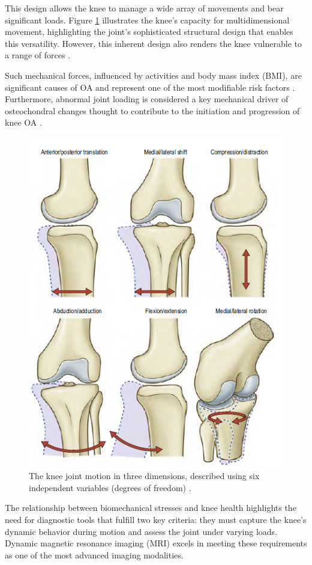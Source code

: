 \documentclass{micro-econ-thesis}
\begin{document}
This design allows the knee to manage a wide array of movements and bear significant loads. Figure \ref{fig:sixdegrees} illustrates the knee's capacity for multidimensional movement, highlighting the joint's sophisticated structural design that enables this versatility. However, this inherent design also renders the knee vulnerable to a range of forces \parencite{standring_grays_2021}.

Such mechanical forces, influenced by activities and body mass index (BMI), are significant causes of OA and represent one of the most modifiable risk factors \parencite{heidari_knee_2011}. Furthermore, abnormal joint loading is considered a key mechanical driver of osteochondral changes thought to contribute to the initiation and progression of knee OA \parencite{coburn_immediate_2023}.

\begin{figure}[H]
	\centering
	\includegraphics[width=0.7\linewidth]{six_degrees}
	\caption{The knee joint motion in three dimensions, described using six independent variables (degrees of freedom) \parencite[p.~1412]{standring_grays_2021}.}
	\label{fig:sixdegrees}
\end{figure}

The relationship between biomechanical stresses and knee health highlights the need for diagnostic tools that fulfill two key criteria: they must capture the knee's dynamic behavior during motion and assess the joint under varying loads. Dynamic magnetic resonance imaging (MRI) excels in meeting these requirements as one of the most advanced imaging modalities.
\end{document}
